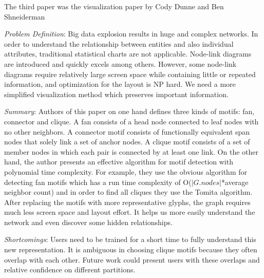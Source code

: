 The third paper was the visualization paper by Cody Dunne and Ben Shneiderman
\cite{motif}
\begin{itemize*}
\item{\em Problem Definition}:
Big data explosion results in huge and complex networks. In order to understand the relationship between entities and also individual attributes, traditional statistical charts are not applicable. Node-link diagrams are introduced and quickly excels among others. However, some node-link diagrams require relatively large screen space while containing little or repeated information, and optimization for the layout is NP hard. We need a more simplified visualization method which preserves important information.
\item{\em Summary}:
Authors of this paper on one hand defines three kinds of motifs: fan, connector and clique. A fan consists of a head node connected to leaf nodes with no other neighbors. A connector motif consists of functionally equivalent span nodes that solely link a set of anchor nodes. A clique motif consists of a set of member nodes in which each pair is connected by at least one link. On the other hand, the author presents an effective algorithm for motif detection with polynomial time complexity. For example, they use the obvious algorithm for detecting fan motifs which has a run time complexity of O($|G.nodes|$*average neighbor count) and in order to find all cliques they use the Tomita algorithm. After replacing the motifs with more representative glyphs, the graph requires much less screen space and layout effort. It helps us more easily understand the network and even discover some hidden relationships. 
\item{\em Shortcomings}:
Users need to be trained for a short time to fully understand this new representation. It is ambiguous in choosing clique motifs because they often overlap with each other. Future work could present users with these overlaps and relative confidence on different partitions.
\end{itemize*}
